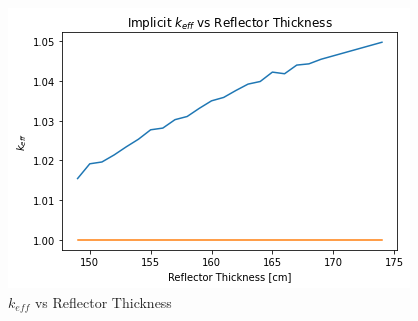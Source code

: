 \begin{figure}[h!]
\centering
\includegraphics{figures/keff-v-rdet.png}
\caption{$k_{eff}$ vs Reflector Thickness}
\label{fig:kvrdet}
\end{figure}